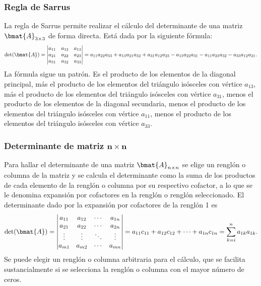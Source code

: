 \documentclass{fmbnotes}
\begin{document}
\subsubsection{Regla de Sarrus}
La regla de Sarrus permite realizar el cálculo del determinante de una matriz \(\bmat{A}_{3 \times 3}\) de forma directa. Está dada por la siguiente fórmula:
\[ \det(\bmat{A})=\begin{vmatrix}
a_{11} & a_{12} & a_{13} \\ a_{21} & a_{22} & a_{23} \\ a_{31} & a_{32} & a_{33}
\end{vmatrix}= a_{11}a_{22}a_{33}+a_{13}a_{21}a_{32}+a_{31}a_{12}a_{23}-a_{13}a_{22}a_{31}-a_{11}a_{23}a_{32}-a_{33}a_{12}a_{21}.\]
La fórmula sigue un patrón. Es el producto de los elementos de la diagonal principal, más el producto de los elementos del triángulo isósceles con vértice \( a_{13} \), más el producto de los elementos del triángulo isósceles con vértice \( a_{31} \), menos el producto de los elementos de la diagonal secundaria, menos el producto de los elementos del triángulo isósceles con vértice \( a_{11} \), menos el producto de los elementos del triángulo isósceles con vértice \( a_{33} \).

\subsubsection[Determinante de matriz \(n \times n\)]{Determinante de matriz \(\bm{n \times n}\)}
Para hallar el determinante de una matriz \(\bmat{A}_{n \times n}\) se elige un renglón o columna de la matriz y se calcula el determinante como la suma de los productos de cada elemento de la renglón o columna por su respectivo cofactor, a lo que se le denomina expansión por cofactores en la renglón o renglón seleccionado. El determinante dado por la expansión por cofactores de la renglón 1 es
\[\det(\bmat{A})=\begin{vmatrix}
	a_{11} & a_{12} & \cdots & a_{1n} \\
	a_{21} & a_{22} & \cdots & a_{2n} \\
	\vdots & \vdots & \ddots & \vdots  \\
	a_{m1} & a_{m2} & \cdots & a_{mn} \\
	\end{vmatrix}=a_{11}c_{11}+a_{12}c_{12}+\cdots+a_{1n}c_{1n}=\sum_{k=i}^{n}a_{1k}a_{1k}.\]
Se puede elegir un renglón o columna arbitraria para el cálculo, que se facilita sustancialmente si se selecciona la renglón
o columna con el mayor número de ceros.
\end{document}
